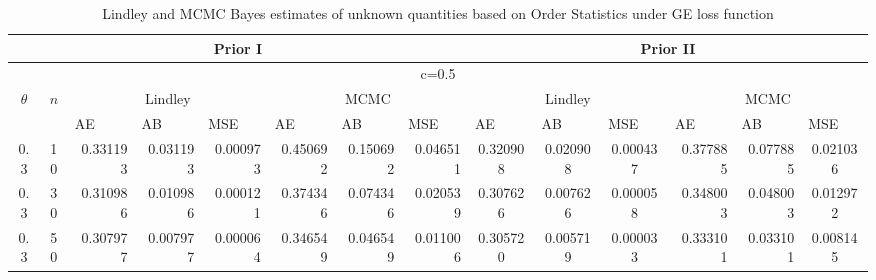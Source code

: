 \documentclass[11pt,a4paper]{article}
\numberwithin{equation}{section}
\begin{document}
	\begin{landscape}


		\begin{table}[htbp]

			\centering

			\caption{Lindley and MCMC Bayes estimates of unknown quantities based on Order Statistics under GE loss function}

			\begin{tabular}{cc|rrr|rrr|rcc|ccc}

				\toprule

				\multicolumn{8}{c|}{Prior I}                                  & \multicolumn{6}{c}{ Prior II} \\

				\midrule

				\multicolumn{14}{c}{                                      c=0.5} \\

				\midrule

				\multirow{2}[4]{*}{$\theta$} & \multirow{2}[4]{*}{$n$} & \multicolumn{3}{c|}{Lindley} & \multicolumn{3}{c|}{MCMC} & \multicolumn{3}{c|}{Lindley} & \multicolumn{3}{c}{MCMC} \\

				\cmidrule{3-14}           &       & \multicolumn{1}{l}{AE} & \multicolumn{1}{l}{AB} & \multicolumn{1}{l|}{MSE} & \multicolumn{1}{l}{AE} & \multicolumn{1}{l}{AB} & \multicolumn{1}{l|}{MSE} & \multicolumn{1}{l}{AE} & \multicolumn{1}{l}{AB} & \multicolumn{1}{l|}{MSE} & \multicolumn{1}{l}{AE} & \multicolumn{1}{l}{AB} & \multicolumn{1}{l}{MSE} \\

				\midrule

				0.3   & 10    & 0.331193 & 0.031193 & 0.000973 & 0.450692 & 0.150692 & 0.046511 & \multicolumn{1}{c}{0.320908} & 0.020908 & 0.000437 & \multicolumn{1}{r}{0.377885} & \multicolumn{1}{r}{0.077885} & 0.021036 \\

				0.3   & 30    & 0.310986 & 0.010986 & 0.000121 & 0.374346 & 0.074346 & 0.020539 & \multicolumn{1}{c}{0.307626} & 0.007626 & 0.000058 & \multicolumn{1}{r}{0.348003} & \multicolumn{1}{r}{0.048003} & 0.012972 \\

				0.3   & 50    & 0.307977 & 0.007977 & 0.000064 & 0.346549 & 0.046549 & 0.011006 & \multicolumn{1}{c}{0.305720} & 0.005719 & 0.000033 & \multicolumn{1}{r}{0.333101} & \multicolumn{1}{r}{0.033101} & 0.008145 \\


\end{tabular}
\end{table}
\end{landscape}
\end{document}
